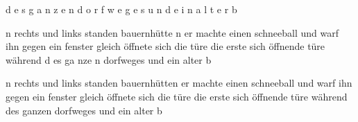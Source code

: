 \documentclass[a4paper,10pt,twoside]{article}
\begin{document}
{\color[rgb]{0.312,0,0} d}{\color[rgb]{0.269,0,0} e}{\color[rgb]{0.119,0,0} s} {\color[rgb]{0.335,0,0} g}{\color[rgb]{0.274,0,0} a}{\color[rgb]{0.546,0,0} n}{\color[rgb]{0.747,0,0} z}{\color[rgb]{1,0,0} e}{\color[rgb]{0.745,0,0} n} {\color[rgb]{1,0,0} d}{\color[rgb]{1,0,0} o}{\color[rgb]{0.0,0,0} r}{\color[rgb]{0.0,0,0} f}{\color[rgb]{0.972,0,0} w}{\color[rgb]{1,0,0} e}{\color[rgb]{1,0,0} g}{\color[rgb]{1,0,0} e}{\color[rgb]{0.598,0,0} s} {\color[rgb]{1,0,0} u}{\color[rgb]{1,0,0} n}{\color[rgb]{0.332,0,0} d} {\color[rgb]{1,0,0} e}{\color[rgb]{1,0,0} i}{\color[rgb]{1,0,0} n} {\color[rgb]{1,0,0} a}{\color[rgb]{1,0,0} l}{\color[rgb]{1,0,0} t}{\color[rgb]{1,0,0} e}{\color[rgb]{1,0,0} r} {\color[rgb]{0.0,0,0} b}

n rechts und links {\color[rgb]{1,0,0} s}tanden bauernhütte{\color[rgb]{1,0,0} n} er machte einen schneeball und warf ihn gegen ein fenster gleich öffnete sich die türe die erste sich öffnende türe während d{\color[rgb]{0,0,1} e}s ga{\color[rgb]{1,0,0} n}ze{\color[rgb]{1,0,0} n} dorfweges und ein alter b

 n rechts und links {\color[rgb]{1,0,0} standen} bauernhütten er machte einen schneeball und warf ihn gegen ein fenster {\color[rgb]{1,0,0} gleich} {\color[rgb]{1,0,0} öffnete} {\color[rgb]{1,0,0} sich} die türe die erste {\color[rgb]{1,0,0} sich} {\color[rgb]{1,0,0} öffnende} türe während des ganzen dorfweges und ein alter b
 
\end{document}
